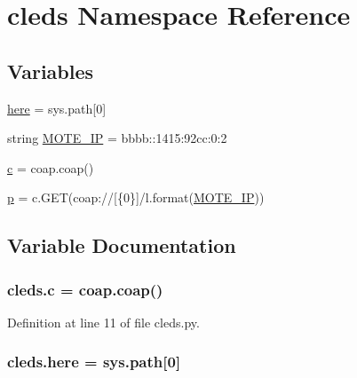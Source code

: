 \hypertarget{namespacecleds}{}\section{cleds Namespace Reference}
\label{namespacecleds}
\subsection*{Variables}
\begin{DoxyCompactItemize}
\item 
\hyperlink{namespacecleds_ae1c40242d740212f03d3c05c52dd8093}{here} = sys.\+path\mbox{[}0\mbox{]}
\item 
string \hyperlink{namespacecleds_a9a2c12b44feb059b23acbdfa6c7faaf7}{M\+O\+T\+E\+\_\+\+IP} = \textquotesingle{}bbbb\+::1415\+:92cc\+:0\+:2\textquotesingle{}
\item 
\hyperlink{namespacecleds_a8c3b027973fd657646b75595c8c17a25}{c} = coap.\+coap()
\item 
\hyperlink{namespacecleds_a13c2b6ecb2e12045fd9a9df703991cfe}{p} = c.\+G\+ET(\textquotesingle{}coap\+://\mbox{[}\{0\}\mbox{]}/l\textquotesingle{}.format(\hyperlink{namespacecleds_a9a2c12b44feb059b23acbdfa6c7faaf7}{M\+O\+T\+E\+\_\+\+IP}))
\end{DoxyCompactItemize}


\subsection{Variable Documentation}
\subsubsection[{\texorpdfstring{c}{c}}]{\setlength{\rightskip}{0pt plus 5cm}cleds.\+c = coap.\+coap()}\hypertarget{namespacecleds_a8c3b027973fd657646b75595c8c17a25}{}\label{namespacecleds_a8c3b027973fd657646b75595c8c17a25}


Definition at line 11 of file cleds.\+py.

\subsubsection[{\texorpdfstring{here}{here}}]{\setlength{\rightskip}{0pt plus 5cm}cleds.\+here = sys.\+path\mbox{[}0\mbox{]}}\hypertarget{namespacecleds_ae1c40242d740212f03d3c05c52dd8093}{}\label{namespacecleds_ae1c40242d740212f03d3c05c52dd8093}



